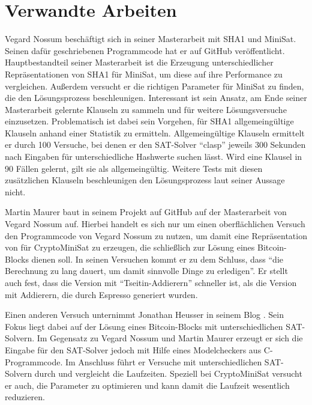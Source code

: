 \section{Verwandte Arbeiten}
\label{sec:otherwork}

Vegard Nossum beschäftigt sich in seiner Masterarbeit \cite{vegard:1} mit SHA1 und MiniSat.
Seinen dafür geschriebenen Programmcode hat er auf GitHub \cite{vegard:2} veröffentlicht.
Hauptbestandteil seiner Masterarbeit ist die Erzeugung unterschiedlicher Repräsentationen von SHA1 für
MiniSat, um diese auf ihre Performance zu vergleichen. Außerdem versucht er die richtigen Parameter für
MiniSat zu finden, die den Lösungsprozess beschleunigen. Interessant ist sein Ansatz, am Ende seiner
Masterarbeit gelernte Klauseln zu sammeln und für weitere Lösungsversuche einzusetzen. Problematisch
ist dabei sein Vorgehen, für SHA1 allgemeingültige Klauseln anhand einer Statistik zu ermitteln.
Allgemeingültige Klauseln ermittelt er durch 100 Versuche, bei denen er den SAT-Solver "`clasp"'
jeweils 300 Sekunden nach Eingaben für unterschiedliche Hashwerte suchen lässt. Wird eine Klausel
in 90 Fällen gelernt, gilt sie als allgemeingültig. Weitere Tests mit diesen zusätzlichen Klauseln
beschleunigen den Lösungsprozess laut seiner Aussage nicht.

Martin Maurer baut in seinem Projekt auf GitHub \cite{capiman} auf der Masterarbeit von Vegard Nossum auf.
Hierbei handelt es sich nur um einen oberflächlichen Versuch den Programmcode von Vegard Nossum zu nutzen,
um damit eine Repräsentation von  für CryptoMiniSat zu erzeugen, die schließlich zur Lösung eines
Bitcoin-Blocks dienen soll. In seinen Versuchen kommt er zu dem Schluss, dass "`die Berechnung zu lang dauert,
um damit sinnvolle Dinge zu erledigen"'. Er stellt auch fest, dass die Version mit "`Tseitin-Addierern"'
schneller ist, als die Version mit Addierern, die durch Espresso generiert wurden.

Einen anderen Versuch unternimmt Jonathan Heusser in seinem Blog \cite{jona:1}. Sein Fokus liegt dabei
auf der Lösung eines Bitcoin-Blocks mit unterschiedlichen SAT-Solvern. Im Gegensatz zu Vegard Nossum und
Martin Maurer erzeugt er sich die Eingabe für den SAT-Solver jedoch mit Hilfe eines Modelcheckers aus
C-Programmcode. Im Anschluss führt er Versuche mit unterschiedlichen SAT-Solvern durch und vergleicht die
Laufzeiten. Speziell bei CryptoMiniSat versucht er auch, die Parameter zu optimieren und kann damit die
Laufzeit wesentlich reduzieren.